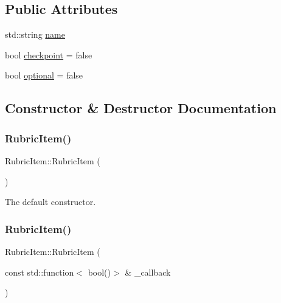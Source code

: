 \subsection*{Public Attributes}
\begin{DoxyCompactItemize}
\item 
std\+::string \hyperlink{class_rubric_item_accc3649acf6ae1bb543b56d826a3d01f}{name}
\item 
bool \hyperlink{class_rubric_item_a0f240be9e7b0dc6853b3e2b0df5713b8}{checkpoint} = false
\item 
bool \hyperlink{class_rubric_item_aebc5a7d15f0c2f5addc66fdb854693c0}{optional} = false
\end{DoxyCompactItemize}


\subsection{Constructor \& Destructor Documentation}
\hypertarget{class_rubric_item_a0fac66f38c2f2a1712690c3728b1a63d}{}\label{class_rubric_item_a0fac66f38c2f2a1712690c3728b1a63d} 
\subsubsection{\texorpdfstring{Rubric\+Item()}{RubricItem()}\hspace{0.1cm}{\footnotesize\ttfamily [1/4]}}
{\footnotesize\ttfamily Rubric\+Item\+::\+Rubric\+Item (\begin{DoxyParamCaption}{ }\end{DoxyParamCaption})\hspace{0.3cm}{\ttfamily [default]}}

The default constructor. \hypertarget{class_rubric_item_a9ab3ef65052c84f8fb59764429e67980}{}\label{class_rubric_item_a9ab3ef65052c84f8fb59764429e67980} 
\subsubsection{\texorpdfstring{Rubric\+Item()}{RubricItem()}\hspace{0.1cm}{\footnotesize\ttfamily [2/4]}}
{\footnotesize\ttfamily Rubric\+Item\+::\+Rubric\+Item (\begin{DoxyParamCaption}\item[{const std\+::function$<$ bool()$>$ \&}]{\+\_\+callback }\end{DoxyParamCaption})\hspace{0.3cm}{\ttfamily [inline]}}

